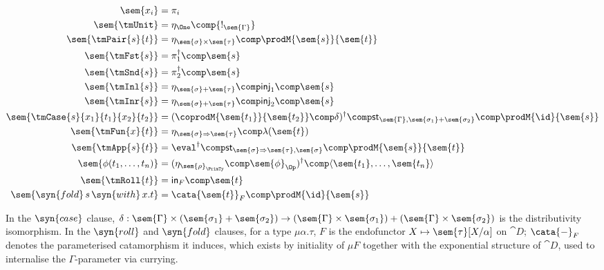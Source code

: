 \begin{align*}
\sem{x_i}                              & = \pi_i \\
\sem{\tmUnit}                          & = \eta_{\One} \comp {!_{\sem{\Gamma}}} \\
\sem{\tmPair{s}{t}}                    & = \eta_{\sem{\sigma}\times\sem{\tau}} \comp
                                            \prodM{\sem{s}}{\sem{t}} \\
\sem{\tmFst{s}}                        & = \pi_1^\dagger \comp \sem{s} \\
\sem{\tmSnd{s}}                        & = \pi_2^\dagger \comp \sem{s} \\
\sem{\tmInl{s}}                        & = \eta_{\sem{\sigma}+\sem{\tau}} \comp \mathsf{inj}_1
                                            \comp \sem{s} \\
\sem{\tmInr{s}}                        & = \eta_{\sem{\sigma}+\sem{\tau}} \comp \mathsf{inj}_2
                                            \comp \sem{s} \\
\sem{\tmCase{s}{x_1}{t_1}{x_2}{t_2}}   & = (\coprodM{\sem{t_1}}{\sem{t_2}} \comp \delta)^\dagger \comp
                                            \mathsf{st}_{\sem{\Gamma}, \sem{\sigma_1}+\sem{\sigma_2}}
                                            \comp \prodM{\id}{\sem{s}} \\
\sem{\tmFun{x}{t}}                     & = \eta_{\sem{\sigma}\Rightarrow\sem{\tau}} \comp \lambda(\sem{t}) \\
\sem{\tmApp{s}{t}}                     & = \eval^\dagger \comp
                                            \mathsf{st}_{\sem{\sigma}\Rightarrow\sem{\tau}, \sem{\sigma}}
                                            \comp \prodM{\sem{s}}{\sem{t}} \\
\sem{\phi(t_1, \ldots, t_n)}           & = (\eta_{\sem{\rho}_{\PrimTy}} \comp \sem{\phi}_{\Op})^\dagger
                                            \comp \langle\sem{t_1}, \ldots, \sem{t_n}\rangle \\
\sem{\tmRoll{t}}                       & = \mathsf{in}_F \comp \sem{t} \\
\sem{\syn{fold}\,s\,\syn{with}\,x.t}   & = \cata{\sem{t}}_F \comp \prodM{\id}{\sem{s}}
\end{align*}

In the $\syn{case}$ clause, $\delta : \sem{\Gamma} \times (\sem{\sigma_1}+\sem{\sigma_2}) \to
(\sem{\Gamma}\times\sem{\sigma_1}) + (\sem{\Gamma}\times\sem{\sigma_2})$ is the distributivity
isomorphism. In the $\syn{roll}$ and $\syn{fold}$ clauses, for a type $\mu\alpha.\tau$, $F$ is
the endofunctor $X \mapsto \sem{\tau}[X/\alpha]$ on $\cat{D}$; $\cata{-}_F$ denotes the
parameterised catamorphism it induces, which exists by initiality of $\mu F$ together with the
exponential structure of $\cat{D}$, used to internalise the $\Gamma$-parameter via currying.

